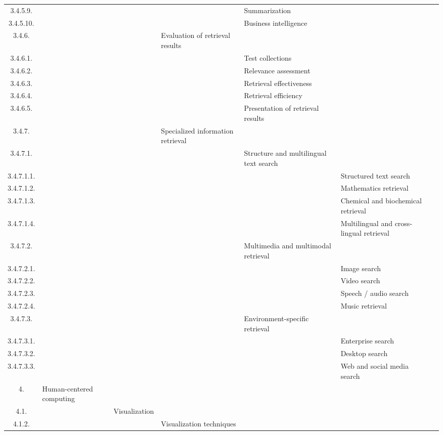 \documentclass[12pt]{article}
\begin{document}
\begin{center}
{\begin{tabularx}{\linewidth}{|c|X|X|X|X|X|X|}
		3.4.5.9. &   &   &   &  Summarization &   &   \\
		3.4.5.10. &   &   &   &  Business intelligence &   &   \\
		3.4.6. &   &   &  Evaluation of retrieval results &   &   &   \\
		3.4.6.1. &   &   &   &  Test collections &   &   \\
		3.4.6.2. &   &   &   &  Relevance assessment &   &   \\
		3.4.6.3. &   &   &   &  Retrieval effectiveness &   &   \\
		3.4.6.4. &   &   &   &  Retrieval efficiency &   &   \\
		3.4.6.5. &   &   &   &  Presentation of retrieval results &   &   \\
		3.4.7. &   &   &  Specialized information retrieval &   &   &   \\
		3.4.7.1. &   &   &   &  Structure and multilingual text search &   &   \\
		3.4.7.1.1. &   &   &   &   &  Structured text search &   \\
		3.4.7.1.2. &   &   &   &   &  Mathematics retrieval &   \\
		3.4.7.1.3. &   &   &   &   &  Chemical and biochemical retrieval &   \\
		3.4.7.1.4. &   &   &   &   &  Multilingual and cross-lingual retrieval &   \\
		3.4.7.2. &   &   &   &  Multimedia and multimodal retrieval &   &   \\
		3.4.7.2.1. &   &   &   &   &  Image search &   \\
		3.4.7.2.2. &   &   &   &   &  Video search &   \\
		3.4.7.2.3. &   &   &   &   &  Speech / audio search &   \\
		3.4.7.2.4. &   &   &   &   &  Music retrieval &   \\
		3.4.7.3. &   &   &   &  Environment-specific retrieval &   &   \\
		3.4.7.3.1. &   &   &   &   &  Enterprise search &   \\
		3.4.7.3.2. &   &   &   &   &  Desktop search &   \\
		3.4.7.3.3. &   &   &   &   &  Web and social media search &   \\
		4. &  Human-centered computing &   &   &   &   &   \\
		4.1. &   &  Visualization &   &   &   &   \\
		4.1.2. &   &   &  Visualization techniques &   &   &   \\

\end{tabularx}}
\end{center}
\end{document}
